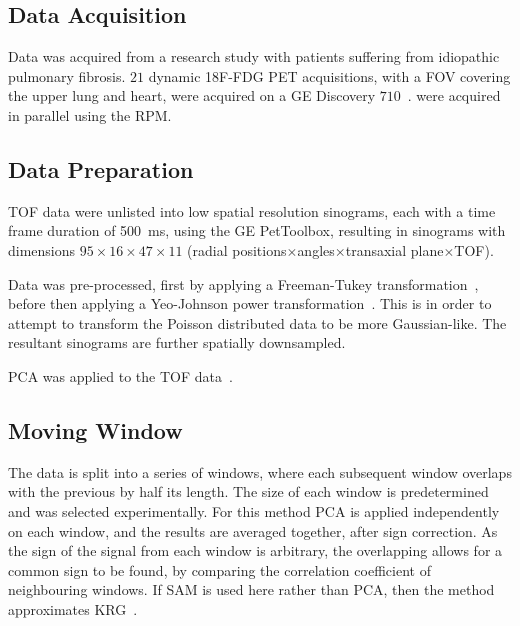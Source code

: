     \subsection{Data Acquisition} \label{sec:data_acquisition}
        Data was acquired from a research study with patients suffering from idiopathic pulmonary fibrosis. $21$ dynamic \acrshort{18F-FDG} \acrshort{PET} acquisitions, with a \acrlong{FOV} covering the upper lung and heart, were acquired on a \acrshort{GE} Discovery $710$~\cite{Oh2019OptimalTreatment, Emond2020EffectReconstruction}.  were acquired in parallel using the \gls{RPM}.
    
        
    \subsection{Data Preparation} \label{sec:data_preparation}
        \gls{TOF} data were unlisted into low spatial resolution sinograms, each with a time frame duration of \SI{500}{\milli\second}, using the \acrshort{GE} PetToolbox, resulting in sinograms with dimensions $95\times16\times47\times11$ (radial positions$\times$angles$\times$transaxial plane$\times$\gls{TOF}).
        
        Data was pre-processed, first by applying a Freeman-Tukey transformation~\cite{Freeman1950TransformationsRoot}, before then applying a Yeo-Johnson power transformation~\cite{Yeo2000ASymmetry}. This is in order to attempt to transform the Poisson distributed data to be more Gaussian-like. The resultant sinograms are further spatially downsampled.
        
        \acrshort{PCA} was applied to the \gls{TOF} data~\cite{Bertolli2017DataData}.
    
        
    \subsection{Moving Window} \label{sec:moving_window}
        The data is split into a series of windows, where each subsequent window overlaps with the previous by half its length. The size of each window is predetermined and was selected experimentally. For this method \acrshort{PCA} is applied independently on each window, and the results are averaged together, after sign correction. As the sign of the signal from each window is arbitrary, the overlapping allows for a common sign to be found, by comparing the correlation coefficient of neighbouring windows. If \gls{SAM} is used here rather than \acrshort{PCA}, then the method approximates \gls{KRG}~\cite{Schleyer2014}.
        
